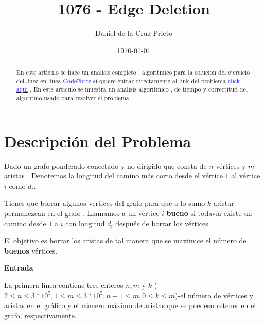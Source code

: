 \documentclass[10pt]{article}
\begin{document}
    \title{1076 - Edge Deletion}
    \author{Daniel de la Cruz Prieto}
    \date{\today}
    \maketitle

    \begin{abstract}
        \noindent En este art\'iculo se hace un analisis completo , 
        algoritmico para la solucion del ejercicio del Juez en 
        l\'inea \href{https://codeforces.com}{\textcolor{blue}{CodeForce}} 
        si quiere entrar directamente al link del problema 
        \href{https://codeforces.com/problemset/problem/1076/D}{\textcolor{blue}{click aqui}} 
        . En este articulo se muestra un analisis algoritmico , de tiempo y correctitud del 
        algoritmo usado para resolver el problema 
    \end{abstract}

    \section*{Descripci\'on del Problema } 

    \begin{flushleft}
        Dado un grafo ponderado conectado y  no dirigido que consta de $n$ v\'ertices y $m$ aristas . Denotemos la longitud del camino m\'as corto desde el v\'ertice $1$ al v\'ertice $i$ como $d_i$.
    \end{flushleft}

    \begin{flushleft}
       Tienes que borrar algunos vertices del grafo para que a lo sumo  $k$ aristar permanezcan en el grafo . Llamamos a un v\'ertice $i$ {\bf bueno} si todav\'ia existe un camino desde $1$ a $i$ con longitud $d_i$ despu\'es de borrar los v\'ertices .
    \end{flushleft}

    \begin{flushleft}
        El objetivo es borrar los aristas de tal manera que se maximice el n\'umero de {\bf buenos} v\'ertices.
    \end{flushleft}

    \begin{flushleft}
        {\bf Entrada}
    \end{flushleft}

    \begin{flushleft}
       La primera l\'inea contiene tres enteros $n,m$ y $k$ ($2 \leq n \leq 3*10^5,1\leq m \leq 3*10^5,n-1\leq m,0\leq k \leq m$)-el n\'umero de v\'ertices y aristas en el gr\'afico y el n\'umero m\'aximo de aristas que se puedesn retener en el grafo, respectivamente.
    \end{flushleft}
\end{document}
